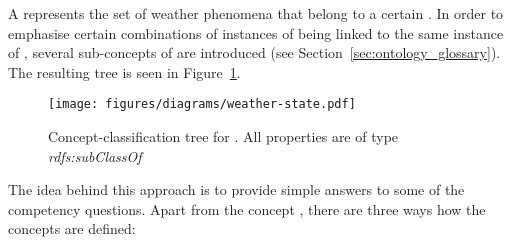 A  represents the set of weather phenomena that belong to a certain . In order to emphasise certain combinations of instances of  being linked to the same instance of , several sub-concepts of  are introduced (see Section~\ref{sec:ontology_glossary}). The resulting tree is seen in Figure~\ref{fig:tree_weather_state}.

\begin{figure}
  \centering
  \texttt{[image: figures/diagrams/weather-state.pdf]}
  \caption{Concept-classification tree for . All properties are of type \emph{rdfs:subClassOf}}
  \label{fig:tree_weather_state}
\end{figure}

The idea behind this approach is to provide simple answers to some of the competency questions. Apart from the concept , there are three ways how the concepts are defined:

